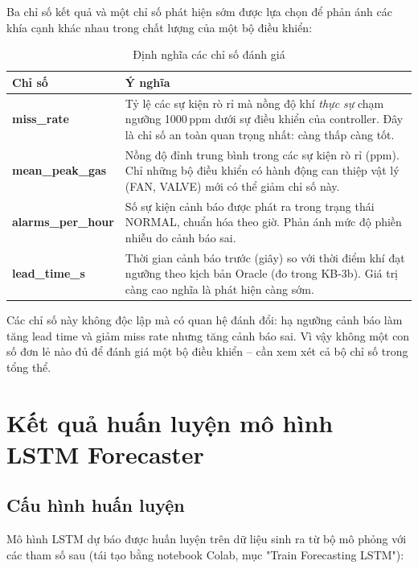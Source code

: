 Ba chỉ số kết quả và một chỉ số phát hiện sớm được lựa chọn để phản ánh các khía cạnh khác nhau trong chất lượng của một bộ điều khiển:

\begin{table}[H]
\centering
\caption{Định nghĩa các chỉ số đánh giá}
\label{tab:metrics}
\begin{tabular}{lp{10cm}}
\toprule
\textbf{Chỉ số} & \textbf{Ý nghĩa} \\
\midrule
\textbf{miss\_rate} & Tỷ lệ các sự kiện rò rỉ mà nồng độ khí \emph{thực sự} chạm ngưỡng 1000\,ppm dưới sự điều khiển của controller. Đây là chỉ số an toàn quan trọng nhất: càng thấp càng tốt. \\
\addlinespace
\textbf{mean\_peak\_gas} & Nồng độ đỉnh trung bình trong các sự kiện rò rỉ (ppm). Chỉ những bộ điều khiển có hành động can thiệp vật lý (FAN, VALVE) mới có thể giảm chỉ số này. \\
\addlinespace
\textbf{alarms\_per\_hour} & Số sự kiện cảnh báo được phát ra trong trạng thái NORMAL, chuẩn hóa theo giờ. Phản ánh mức độ phiền nhiễu do cảnh báo sai. \\
\addlinespace
\textbf{lead\_time\_s} & Thời gian cảnh báo trước (giây) so với thời điểm khí đạt ngưỡng theo kịch bản Oracle (đo trong KB-3b). Giá trị càng cao nghĩa là phát hiện càng sớm. \\
\bottomrule
\end{tabular}
\end{table}

Các chỉ số này không độc lập mà có quan hệ đánh đổi: hạ ngưỡng cảnh báo làm tăng lead time và giảm miss rate nhưng tăng cảnh báo sai. Vì vậy không một con số đơn lẻ nào đủ để đánh giá một bộ điều khiển -- cần xem xét cả bộ chỉ số trong tổng thể.

\section{Kết quả huấn luyện mô hình LSTM Forecaster}

\subsection{Cấu hình huấn luyện}

Mô hình LSTM dự báo được huấn luyện trên dữ liệu sinh ra từ bộ mô phỏng với các tham số sau (tái tạo bằng notebook Colab, mục "Train Forecasting LSTM"):

